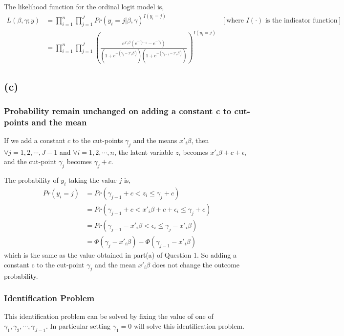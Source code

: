 \documentclass[a4paper]{article}
\begin{document}
The likelihood function for the ordinal logit model is,
\begin{align*}
    L(\beta,\gamma;y) &= \prod_{i=1}^{n}\prod_{j=1}^{J} Pr(y_i = j | \beta, \gamma)^{I(y_i = j)} &[\text{where } I(\cdot) \text{ is the indicator function}]\\
                      &= \displaystyle \prod_{i=1}^{n}\prod_{j=1}^{J} \left(\frac{e^{x'_i\beta}(e^{-\gamma_{j-1}} - e^{-\gamma_{j}})}{(1+e^{-(\gamma_j - x'_{i}\beta)})(1+e^{-(\gamma_{j-1} - x'_{i}\beta)})}\right)^{I(y_i = j)}
\end{align*}

\subsection*{(c)}

\subsubsection*{Probability remain unchanged on adding a constant c to cut-points and the mean}

If we add a constant $c$ to the cut-points $\gamma_j$ and the means $x'_i\beta$, then $\forall j = 1,2,\cdots, J-1$ and $\forall i = 1,2,\cdots, n$,  the latent variable $z_i$ becomes $x'_i\beta + c + \epsilon_i$ and the cut-point $\gamma_j$ becomes $\gamma_j + c$.
\vspace{0.25cm}

\noindent The probability of $y_i$ taking the value $j$ is,
\begin{align*}
    Pr(y_i = j) &= Pr(\gamma_{j-1}+c < z_i \leq \gamma_j + c)\\
                &= Pr(\gamma_{j-1}+c < x'_i\beta + c + \epsilon_i \leq \gamma_j + c)\\
                &= Pr(\gamma_{j-1} - x'_i\beta  < \epsilon_i \leq \gamma_j - x'_i\beta ) \\
                &= \Phi(\gamma_j - x'_i\beta) - \Phi(\gamma_{j-1} - x'_i\beta)
\end{align*}
which is the same as the value obtained in part(a) of Question 1. So adding a constant c to the cut-point $\gamma_j$ and the mean $x'_i\beta$ does not change the outcome probability.

\subsubsection*{Identification Problem}
This identification problem can be solved by fixing the value of one of $\gamma_1, \gamma_2, \cdots, \gamma_{J-1}$. In particular setting $\gamma_1 = 0$ will solve this identification problem.
\end{document}
